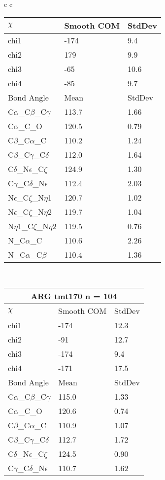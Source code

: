 \begin{longtable}{ c c }
\begin{tabular}{ l l l }
  $\chi$       & Smooth COM & StdDev \\ \midrule
  chi1 & -174 & 9.4 \\ 
  chi2 & 179 & 9.9 \\ 
  chi3 & -65 & 10.6 \\ 
  chi4 & -85 & 9.7 \\ \midrule
  Bond Angle   & Mean     & StdDev \\ \midrule
  C$\alpha$\_C$\beta$\_C$\gamma$ & 113.7 & 1.66\\
  C$\alpha$\_C\_O & 120.5 & 0.79\\
  C$\beta$\_C$\alpha$\_C & 110.2 & 1.24\\
  C$\beta$\_C$\gamma$\_C$\delta$ & 112.0 & 1.64\\
  C$\delta$\_N$\epsilon$\_C$\zeta$ & 124.9 & 1.30\\
  C$\gamma$\_C$\delta$\_N$\epsilon$ & 112.4 & 2.03\\
  N$\epsilon$\_C$\zeta$\_N$\eta$1 & 120.7 & 1.02\\
  N$\epsilon$\_C$\zeta$\_N$\eta$2 & 119.7 & 1.04\\
  N$\eta$1\_C$\zeta$\_N$\eta$2 & 119.5 & 0.76\\
  N\_C$\alpha$\_C & 110.6 & 2.26\\
  N\_C$\alpha$\_C$\beta$ & 110.4 & 1.36\\
  \bottomrule
  \end{tabular}
  \\
  \begin{tabular}{ l l l }
  \toprule
  \multicolumn{3}{c}{ARG \textbf{tmt170} n = 104} \\ \toprule
  $\chi$       & Smooth COM & StdDev \\ \midrule
  chi1 & -174 & 12.3 \\ 
  chi2 & -91 & 12.7 \\ 
  chi3 & -174 & 9.4 \\ 
  chi4 & -171 & 17.5 \\ \midrule
  Bond Angle   & Mean     & StdDev \\ \midrule
  C$\alpha$\_C$\beta$\_C$\gamma$ & 115.0 & 1.33\\
  C$\alpha$\_C\_O & 120.6 & 0.74\\
  C$\beta$\_C$\alpha$\_C & 110.9 & 1.07\\
  C$\beta$\_C$\gamma$\_C$\delta$ & 112.7 & 1.72\\
  C$\delta$\_N$\epsilon$\_C$\zeta$ & 124.5 & 0.90\\
  C$\gamma$\_C$\delta$\_N$\epsilon$ & 110.7 & 1.62\\

\end{tabular}
\end{longtable}
